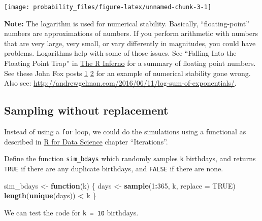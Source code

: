 \documentclass[]{book}
\newenvironment{Shaded}{\begin{snugshade}}{\end{snugshade}}
\newcommand{\ControlFlowTok}[1]{\textcolor[rgb]{0.13,0.29,0.53}{\textbf{#1}}}
\newcommand{\DataTypeTok}[1]{\textcolor[rgb]{0.13,0.29,0.53}{#1}}
\newcommand{\DecValTok}[1]{\textcolor[rgb]{0.00,0.00,0.81}{#1}}
\newcommand{\KeywordTok}[1]{\textcolor[rgb]{0.13,0.29,0.53}{\textbf{#1}}}
\newcommand{\NormalTok}[1]{#1}
\newcommand{\OperatorTok}[1]{\textcolor[rgb]{0.81,0.36,0.00}{\textbf{#1}}}
\newcommand{\OtherTok}[1]{\textcolor[rgb]{0.56,0.35,0.01}{#1}}
\newcommand{\StringTok}[1]{\textcolor[rgb]{0.31,0.60,0.02}{#1}}
\theoremstyle{definition}
\theoremstyle{definition}
\theoremstyle{definition}
\theoremstyle{remark}
\begin{document}
\begin{center}\texttt{[image: probability\_files/figure-latex/unnamed-chunk-3-1]} \end{center}

\textbf{Note:} The logarithm is used for numerical stability. Basically,
``floating-point'' numbers are approximations of numbers. If you perform
arithmetic with numbers that are very large, very small, or vary
differently in magnitudes, you could have problems. Logarithms help with
some of those issues. See ``Falling Into the Floating Point Trap'' in
\href{http://www.burns-stat.com/pages/Tutor/R_inferno.pdf}{The R
Inferno} for a summary of floating point numbers. See these John Fox
posts
\href{http://www.johndcook.com/blog/2008/09/26/comparing-three-methods-of-computing-standard-deviation/}{1}
\href{http://www.johndcook.com/blog/2008/09/28/theoretical-explanation-for-numerical-results/}{2}
for an example of numerical stability gone wrong. Also see:
\url{http://andrewgelman.com/2016/06/11/log-sum-of-exponentials/}.

\hypertarget{sampling-without-replacement}{%
\subsection{Sampling without
replacement}\label{sampling-without-replacement}}

Instead of using a \texttt{for} loop, we could do the simulations using
a functional as described in \href{http://r4ds.had.co.nz/}{R for Data
Science} chapter ``Iterations''.

Define the function \texttt{sim\_bdays} which randomly samples
\texttt{k} birthdays, and returns \texttt{TRUE} if there are any
duplicate birthdays, and \texttt{FALSE} if there are none.

\begin{Shaded}
\begin{Highlighting}[]
\NormalTok{sim_bdays <-}\StringTok{ }\ControlFlowTok{function}\NormalTok{(k) \{}
\NormalTok{  days <-}\StringTok{ }\KeywordTok{sample}\NormalTok{(}\DecValTok{1}\OperatorTok{:}\DecValTok{365}\NormalTok{, k, }\DataTypeTok{replace =} \OtherTok{TRUE}\NormalTok{)}
  \KeywordTok{length}\NormalTok{(}\KeywordTok{unique}\NormalTok{(days)) }\OperatorTok{<}\StringTok{ }\NormalTok{k}
\NormalTok{\}}
\end{Highlighting}
\end{Shaded}

We can test the code for \texttt{k\ =\ 10} birthdays.
\end{document}
